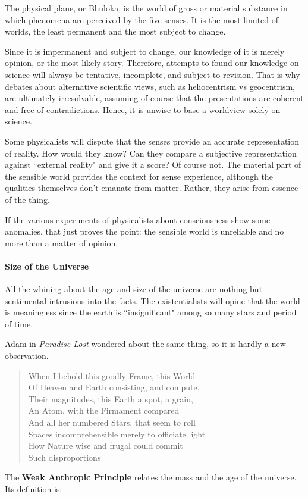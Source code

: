 \begin{quotex}
The physical plane, or Bhuloka, is the world of gross or material substance in which phenomena are perceived by the five senses. It is the most limited of worlds, the least permanent and the most subject to change. 

\end{quotex}
Since it is impermanent and subject to change, our knowledge of it is merely opinion, or the most likely story. Therefore, attempts to found our knowledge on science will always be tentative, incomplete, and subject to revision. That is why debates about alternative scientific views, such as heliocentrism vs geocentrism, are ultimately irresolvable, assuming of course that the presentations are coherent and free of contradictions. Hence, it is unwise to base a worldview solely on science.

Some physicalists will dispute that the senses provide an accurate representation of reality. How would they know? Can they compare a subjective representation against ``external reality" and give it a score? Of course not. The material part of the sensible world provides the context for sense experience, although the qualities themselves don't emanate from matter. Rather, they arise from essence of the thing.

If the various experiments of physicalists about consciousness show some anomalies, that just proves the point: the sensible world is unreliable and no more than a matter of opinion.

\paragraph{Size of the Universe}
All the whining about the age and size of the universe are nothing but sentimental intrusions into the facts. The existentialists will opine that the world is meaningless since the earth is ``insignificant" among so many stars and period of time.

Adam in \textit{Paradise Lost} wondered about the same thing, so it is hardly a new observation.

\begin{verse}
When I behold this goodly Frame, this World\\
Of Heaven and Earth consisting, and compute,\\
Their magnitudes, this Earth a spot, a grain,\\
An Atom, with the Firmament compared\\
And all her numbered Stars, that seem to roll\\
Spaces incomprehensible merely to officiate light\\
How Nature wise and frugal could commit\\
Such disproportions
\end{verse}
The \textbf{Weak Anthropic Principle} relates the mass and the age of the universe. Its definition is:

